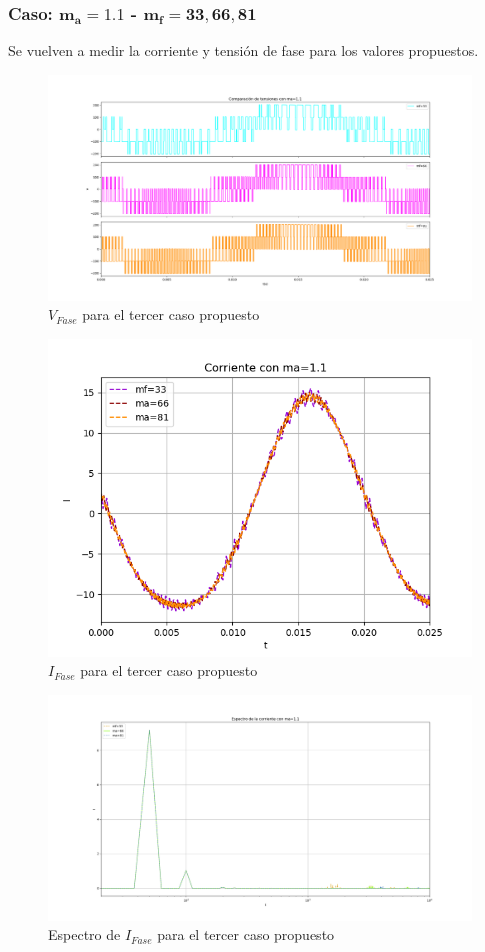 \documentclass[e4_tp3_main.tex]{subfiles}
\begin{document}
\newpage

\subsubsection{Caso: $\mathbf{m_a = 1.1}$ - $\mathbf{m_f = 33,66,81}$}
Se vuelven a medir la corriente y tensión de fase para los valores propuestos.
\begin{figure}[H]
\centering
\includegraphics[width=0.8\linewidth]{Imagenes/Ej2d_V.png}
\caption{$V_{Fase}$ para el tercer caso propuesto}
\end{figure}

\begin{figure}[H]
\centering
\includegraphics[width=0.6\linewidth]{Imagenes/Ej2d_I.png}
\caption{$I_{Fase}$ para el tercer caso propuesto}
\end{figure}

\begin{figure}[H]
\centering
\includegraphics[width=0.9\linewidth]{Imagenes/Ej2dfft.png}
\caption{Espectro de $I_{Fase}$ para el tercer caso propuesto}
\end{figure}
\end{document}
